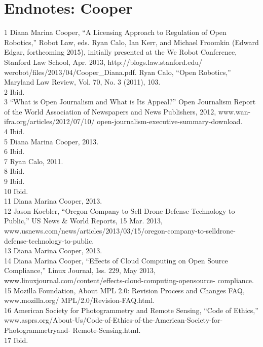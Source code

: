 \section{Endnotes: Cooper}
1 Diana Marina Cooper, ``A Licensing Approach to Regulation of Open Robotics,'' Robot Law, eds.
Ryan Calo, Ian Kerr, and Michael Froomkin (Edward Edgar, forthcoming 2015), initially presented
at the We Robot Conference, Stanford Law School, Apr. 2013, http://blogs.law.stanford.edu/
werobot/files/2013/04/Cooper_Diana.pdf. Ryan Calo, ``Open Robotics,'' Maryland Law Review,
Vol. 70, No. 3 (2011), 103.\\
2 Ibid.\\
3 ``What is Open Journalism and What is Its Appeal?'' Open Journalism Report of the World
Association of Newspapers and News Publishers, 2012, www.wan-ifra.org/articles/2012/07/10/
open-journalism-executive-summary-download.\\
4 Ibid.\\
5 Diana Marina Cooper, 2013.\\
6 Ibid.\\
7 Ryan Calo, 2011.\\
8 Ibid.\\
9 Ibid.\\
10 Ibid.\\
11 Diana Marina Cooper, 2013.\\
12 Jason Koebler, ``Oregon Company to Sell Drone Defense Technology to Public,'' US News & World
Reports, 15 Mar. 2013, www.usnews.com/news/articles/2013/03/15/oregon-company-to-selldrone-
defense-technology-to-public.\\
13 Diana Marina Cooper, 2013.\\
14 Diana Marina Cooper, ``Effects of Cloud Computing on Open Source Compliance,'' Linux
Journal, Iss. 229, May 2013, www.linuxjournal.com/content/effects-cloud-computing-opensource-
compliance.\\
15 Mozilla Foundation, About MPL 2.0: Revision Process and Changes FAQ, www.mozilla.org/
MPL/2.0/Revision-FAQ.html.\\
16 American Society for Photogrammetry and Remote Sensing, ``Code of Ethics,''
www.asprs.org/About-Us/Code-of-Ethics-of-the-American-Society-for-Photogrammetryand-
Remote-Sensing.html.\\
17 Ibid.\\

